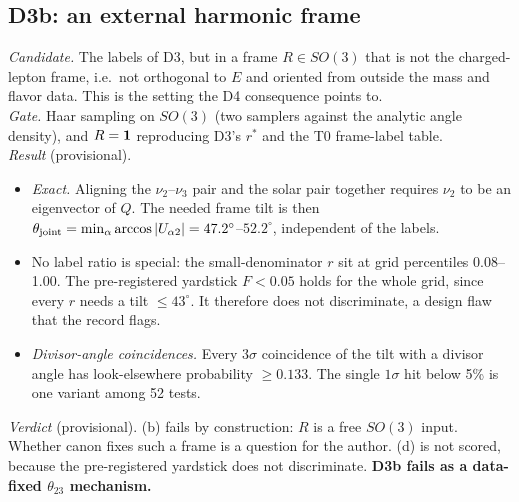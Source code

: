 \subsection{D3b: an external harmonic frame}\label{sec:D3b}
\emph{Candidate.} The labels of D3, but in a frame $R\in SO(3)$ that is not the charged-lepton
frame, i.e.\ not orthogonal to $E$ and oriented from outside the mass and flavor data. This is the
setting the D4 consequence points to.\\
\emph{Gate.} Haar sampling on $SO(3)$ (two samplers against the analytic angle density), and
$R=\mathbf 1$ reproducing D3's $r^*$ and the T0 frame-label table.\\
\emph{Result} (provisional).
\begin{itemize}
\item \emph{Exact.} Aligning the $\nu_2$--$\nu_3$ pair and the solar pair together requires $\nu_2$
  to be an eigenvector of $Q$. The needed frame tilt is then
  $\theta_{\rm joint}=\min_\alpha\arccos|U_{\alpha2}|=47.2^\circ$--$52.2^\circ$, independent of the
  labels.
\item No label ratio is special: the small-denominator $r$ sit at grid percentiles 0.08--1.00.
  The pre-registered yardstick $F<0.05$ holds for the whole grid, since every $r$ needs a tilt
  $\le43^\circ$. It therefore does not discriminate, a design flaw that the record flags.
\item \emph{Divisor-angle coincidences.} Every $3\sigma$ coincidence of the tilt with a divisor
  angle has look-elsewhere probability $\ge0.133$. The single $1\sigma$ hit below 5\% is one variant
  among 52 tests.
\end{itemize}
\emph{Verdict} (provisional). (b) fails by construction: $R$ is a free $SO(3)$ input. Whether canon
fixes such a frame is a question for the author. (d) is not scored, because the pre-registered
yardstick does not discriminate. \textbf{D3b fails as a data-fixed $\theta_{23}$ mechanism.}

